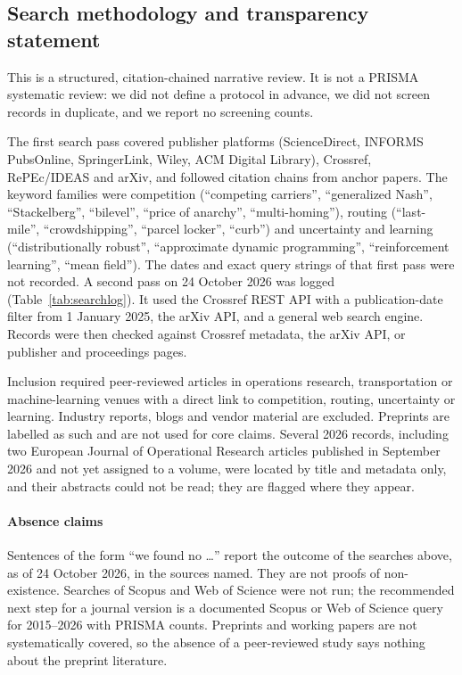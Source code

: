\documentclass[preprint,12pt]{elsarticle}
\begin{document}
\subsection{Search methodology and transparency statement}\label{sec:method}

This is a structured, citation-chained narrative review. It is not a PRISMA systematic review: we did not define a protocol in advance, we did not screen records in duplicate, and we report no screening counts.

The first search pass covered publisher platforms (ScienceDirect, INFORMS PubsOnline, SpringerLink, Wiley, ACM Digital Library), Crossref, RePEc/IDEAS and arXiv, and followed citation chains from anchor papers. The keyword families were competition (``competing carriers'', ``generalized Nash'', ``Stackelberg'', ``bilevel'', ``price of anarchy'', ``multi-homing''), routing (``last-mile'', ``crowdshipping'', ``parcel locker'', ``curb'') and uncertainty and learning (``distributionally robust'', ``approximate dynamic programming'', ``reinforcement learning'', ``mean field''). The dates and exact query strings of that first pass were not recorded. A second pass on 24 October 2026 was logged (Table~\ref{tab:searchlog}). It used the Crossref REST API with a publication-date filter from 1 January 2025, the arXiv API, and a general web search engine. Records were then checked against Crossref metadata, the arXiv API, or publisher and proceedings pages.

Inclusion required peer-reviewed articles in operations research, transportation or machine-learning venues with a direct link to competition, routing, uncertainty or learning. Industry reports, blogs and vendor material are excluded. Preprints are labelled as such and are not used for core claims. Several 2026 records, including two European Journal of Operational Research articles published in September 2026 and not yet assigned to a volume, were located by title and metadata only, and their abstracts could not be read; they are flagged where they appear.

\paragraph{Absence claims} Sentences of the form ``we found no \dots'' report the outcome of the searches above, as of 24 October 2026, in the sources named. They are not proofs of non-existence. Searches of Scopus and Web of Science were not run; the recommended next step for a journal version is a documented Scopus or Web of Science query for 2015--2026 with PRISMA counts. Preprints and working papers are not systematically covered, so the absence of a peer-reviewed study says nothing about the preprint literature.
\end{document}
